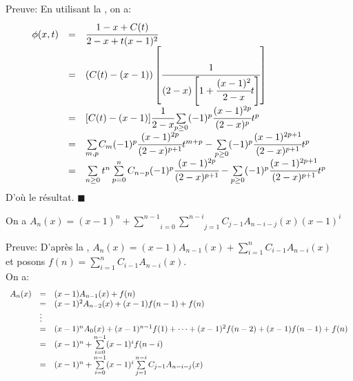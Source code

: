 Preuve:
En utilisant la , on a:\\
\[
	\begin{array}{r c l}
		\phi(x,t) & = & \cfrac{1-x+C(t)}{2-x+t(x-1)^{2}}                                                                                                                                    \\
		          & = & (C(t)-(x-1))\left[\cfrac{1}{(2-x)\left[1+\cfrac{(x-1)^2}{2-x}t\right]}\right]                                                                                       \\
		          & = & [C(t)-(x-1)]\cfrac{1}{2-x}\underset{p\geq0}{\sum}(-1)^p\cfrac{(x-1)^{2p}}{(2-x)^p}t^p                                                                               \\
		          & = & \underset{m,p}{\sum}C_{m}(-1)^p\cfrac{(x-1)^{2p}}{(2-x)^{p+1}}t^{m+p}-\underset{p\geq0}{\sum}(-1)^p\cfrac{(x-1)^{2p+1}}{(2-x)^{p+1}}t^p                             \\
		          & = & \sum\limits_{n\geq 0}t^{n} \sum\limits_{p=0}^{n} C_{n-p}(-1)^{p}\cfrac{(x-1)^{2p}}{(2-x)^{p+1}} - \underset{p\geq0}{\sum}(-1)^p\cfrac{(x-1)^{2p+1}}{(2-x)^{p+1}}t^p \\
	\end{array}
\]
D'où le résultat. \vspace{10pt}$\blacksquare$
\begin{proposition}\label{p1}
	On a
	$A_{n}(x)=(x-1)^{n}+\underset{i=0}{\overset{n-1}{\sum}}\underset{j=1}{\overset{n-i}{\sum}}C_{j-1}A_{n-i-j}(x)(x-1)^{i}$
\end{proposition}
Preuve: D'après la , $A_{n}(x)=(x-1)A_{n-1}(x)+ \sum\limits_{i=1}^{n}C_{i-1}A_{n-i}(x)$\\ et posons $f(n) = \sum\limits_{i=1}^{n}C_{i-1}A_{n-i}(x)$. \\
On a:
\[
	\begin{array}{l l l}
		A_{n}(x) & =      & (x-1)A_{n-1}(x) + f(n)                                                                  \\
		         & =      & (x-1)^{2}A_{n-2}(x) + (x-1)f(n-1) + f(n)                                                \\
		         & \vdots &                                                                                         \\
		         & =      & (x-1)^{n}A_{0}(x) + (x-1)^{n-1}f(1) + \cdots + (x-1)^{2}f(n-2) + (x-1)f(n-1) + f(n)     \\
		         & =      & (x-1)^{n} + \sum\limits_{i=0}^{n-1}(x-1)^{i}f(n-i)                                      \\
		         & =      & (x-1)^{n} + \sum\limits_{i=0}^{n-1}(x-1)^{i} \sum\limits_{j=1}^{n-i}C_{j-1}A_{n-i-j}(x)
	\end{array}
\]
